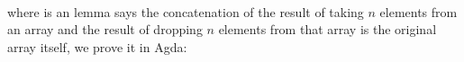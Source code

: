 \documentclass{l4proj}
\begin{document}
\begin{code}
\AgdaSymbol{(}\AgdaSpace{}%
\AgdaSpace{}%
\AgdaSpace{}%
\AgdaOperator{\AgdaFunction{++\AgdaUnderscore{}}}\AgdaSymbol{)}\AgdaSpace{}%
\AgdaSymbol{(}\AgdaSpace{}%
\AgdaSpace{}%
\AgdaSymbol{\{}\AgdaSymbol{\}}\AgdaSpace{}%
\AgdaSymbol{(}\AgdaSpace{}%
\AgdaSpace{}%
\AgdaSymbol{))}\AgdaSpace{}%
\<%
\\
\>[2][@{}l@{\AgdaIndent{0}}]%
\>[4]\AgdaSpace{}%
\AgdaSpace{}%
\AgdaSpace{}%
\AgdaOperator{\AgdaFunction{++}}\AgdaSpace{}%
\AgdaSpace{}%
\AgdaSpace{}%
\<%
\\
%
\>[2]\AgdaSpace{}%
\AgdaSpace{}%
\AgdaSpace{}%
\AgdaSpace{}%
\<%
\\
\>[2][@{}l@{\AgdaIndent{0}}]%
\>[4]\<%
\end{code}
where  is an lemma says the concatenation of the result of taking $n$ elements from an array and the result of dropping $n$ elements from that array is the original array itself, we prove it in Agda:
\end{document}
